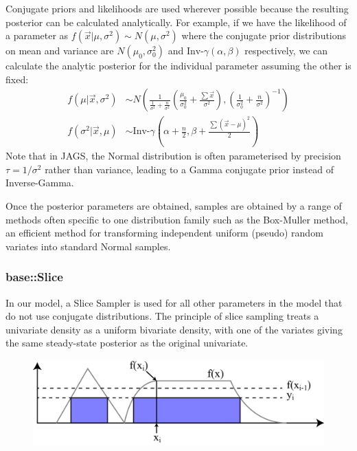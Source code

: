 \documentclass[a4paper, 12pt]{article}
\begin{document}
Conjugate priors and likelihoods are used wherever possible because the resulting posterior can be calculated analytically. For example, if we have the likelihood of a parameter as $f(\vec{x}|\mu,\sigma^2)\sim N(\mu,\sigma^2)$ where the conjugate prior distributions on mean and variance are $N(\mu_0,\sigma^2_0)$ and $\text{Inv-}\gamma(\alpha,\beta)$ respectively, we can calculate the analytic posterior for the individual parameter assuming the other is fixed:
\begin{align}
f(\mu|\vec{x},\sigma^2) &\sim N\left( \frac{1}{\frac{1}{\sigma^2} + \frac{n}{\sigma^2}} \left( \frac{\mu_0}{\sigma^2_0} + \frac{\sum\vec{x}}{\sigma^2} \right) , \left( \frac{1}{\sigma^2_0} + \frac{n}{\sigma^2} \right)^{-1} \right)\\
f(\sigma^2|\vec{x},\mu) &\sim \text{Inv-}\gamma \left( \alpha+\frac{n}{2} , \beta+\frac{\sum(\vec{x}-\mu)^2}{2} \right)
\end{align}
Note that in JAGS, the Normal distribution is often parameterised by precision $\tau = 1/\sigma^2$ rather than variance, leading to a Gamma conjugate prior instead of Inverse-Gamma.

Once the posterior parameters are obtained, samples are obtained by a range of methods often specific to one distribution family such as the Box-Muller method, an efficient method for transforming independent uniform (pseudo) random variates into standard Normal samples.

\subsubsection{base::Slice}
In our model, a Slice Sampler is used for all other parameters in the model that do not use conjugate distributions. The principle of slice sampling treats a univariate density as a uniform bivariate density, with one of the variates giving the same steady-state posterior as the original univariate.

\begin{figure}
  \centering
  \includegraphics[width=0.5\linewidth]{media/slice_sampling}
  \label{fig:slice_sampling}
\end{figure}
\end{document}
